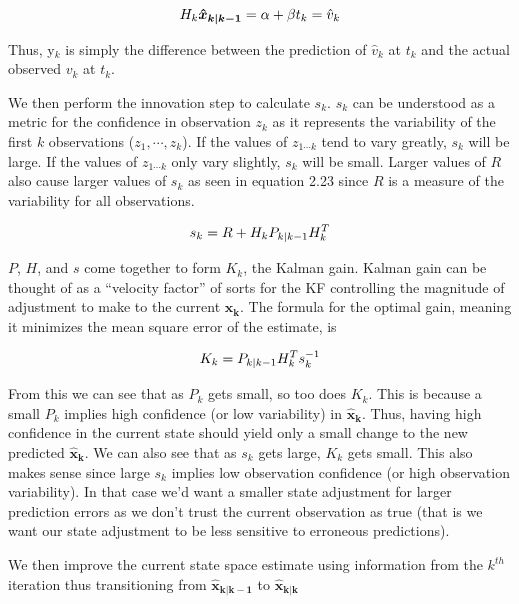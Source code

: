   \begin{equation}
  \centering
    H_{k}\bm{\hat{x}_{k|k-1}} = \alpha + \beta t_{k} = \hat{v}_{k}
  \end{equation}
  
  Thus, y$_{k}$ is simply the difference between the prediction of $\hat{v}_{k}$ at $t_{k}$ and the actual observed $v_{k}$ at $t_{k}$.
  
  We then perform the innovation step to calculate $s_{k}$. $s_{k}$ can be understood as a metric for the confidence in observation $z_{k}$ as it represents the variability of the first $k$ observations ($z_{1}, \cdots , z_{k}$). If the values of $z_{1 \cdots k}$ tend to vary greatly, $s_{k}$ will be large. If the values of $z_{1 \cdots k}$ only vary slightly, $s_{k}$ will be small. Larger values of $R$ also cause larger values of $s_{k}$ as seen in equation 2.23 since $R$ is a measure of the variability for all observations.
  
  \begin{equation}
  \centering
    s_{k} = R + H_{k}P_{k|k-1}H_{k}^{T}
  \end{equation}
  
  $P$, $H$, and $s$ come together to form $K_{k}$, the Kalman gain. Kalman gain can be thought of as a ``velocity factor'' of sorts for the KF controlling the magnitude of adjustment to make to the current $\bm{\hat{x}_{k}}$. The formula for the optimal gain, meaning it minimizes the mean square error of the estimate, is  
  
    \begin{equation}
  \centering
    K_{k} = P_{k|k-1}H_{k}^{T}s_{k}^{-1}
  \end{equation}
  
  From this we can see that as $P_{k}$ gets small, so too does $K_{k}$. This is because a small $P_{k}$ implies high confidence (or low variability) in $\bm{\hat{x}_{k}}$. Thus, having high confidence in the current state should yield only a small change to the new predicted $\bm{\hat{x}_{k}}$. We can also see that as $s_{k}$ gets large, $K_{k}$ gets small. This also makes sense since large $s_{k}$ implies low observation confidence (or high observation variability). In that case we'd want a smaller state adjustment for larger prediction errors as we don't trust the current observation as true (that is we want our state adjustment to be less sensitive to erroneous predictions).
  
  We then improve the current state space estimate using information from the $k^{th}$ iteration thus transitioning from $\bm{\hat{x}_{k|k-1}}$ to $\bm{\hat{x}_{k|k}}$
  
